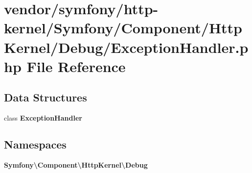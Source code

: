 \section{vendor/symfony/http-\/kernel/\+Symfony/\+Component/\+Http\+Kernel/\+Debug/\+Exception\+Handler.php File Reference}
\label{symfony_2http-kernel_2_symfony_2_component_2_http_kernel_2_debug_2_exception_handler_8php}
\subsection*{Data Structures}
\begin{DoxyCompactItemize}
\item 
class {\bf Exception\+Handler}
\end{DoxyCompactItemize}
\subsection*{Namespaces}
\begin{DoxyCompactItemize}
\item 
 {\bf Symfony\textbackslash{}\+Component\textbackslash{}\+Http\+Kernel\textbackslash{}\+Debug}
\end{DoxyCompactItemize}
